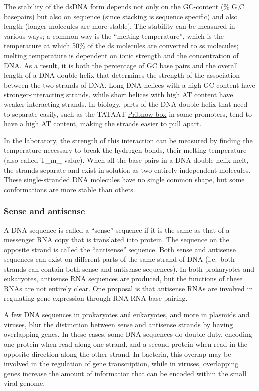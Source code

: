 The stability of the dsDNA form depends not only on the GC-content (\% G,C basepairs) but also on sequence (since stacking is sequence specific) and also length (longer molecules are more stable). The stability can be measured in various ways; a common way is the ``melting temperature'', which is the temperature at which 50\% of the ds molecules are converted to ss molecules; melting temperature is dependent on ionic strength and the concentration of DNA. As a result, it is both the percentage of GC base pairs and the overall length of a DNA double helix that determines the strength of the association between the two strands of DNA. Long DNA helices with a high GC-content have stronger-interacting strands, while short helices with high AT content have weaker-interacting strands. In biology, parts of the DNA double helix that need to separate easily, such as the TATAAT \href{https://en.wikipedia.org/wiki/Pribnow_box}{Pribnow box} in some promoters, tend to have a high AT content, making the strands easier to pull apart.

In the laboratory, the strength of this interaction can be measured by finding the temperature necessary to break the hydrogen bonds, their melting temperature (also called T\_m\_ value). When all the base pairs in a DNA double helix melt, the strands separate and exist in solution as two entirely independent molecules. These single-stranded DNA molecules have no single common shape, but some conformations are more stable than others.

\hypertarget{sense-and-antisense}{%
\subsubsection{Sense and antisense}\label{sense-and-antisense}}

A DNA sequence is called a ``sense'' sequence if it is the same as that of a messenger RNA copy that is translated into protein. The sequence on the opposite strand is called the ``antisense'' sequence. Both sense and antisense sequences can exist on different parts of the same strand of DNA (i.e.~both strands can contain both sense and antisense sequences). In both prokaryotes and eukaryotes, antisense RNA sequences are produced, but the functions of these RNAs are not entirely clear. One proposal is that antisense RNAs are involved in regulating gene expression through RNA-RNA base pairing.

A few DNA sequences in prokaryotes and eukaryotes, and more in plasmids and viruses, blur the distinction between sense and antisense strands by having overlapping genes. In these cases, some DNA sequences do double duty, encoding one protein when read along one strand, and a second protein when read in the opposite direction along the other strand. In bacteria, this overlap may be involved in the regulation of gene transcription, while in viruses, overlapping genes increase the amount of information that can be encoded within the small viral genome.

